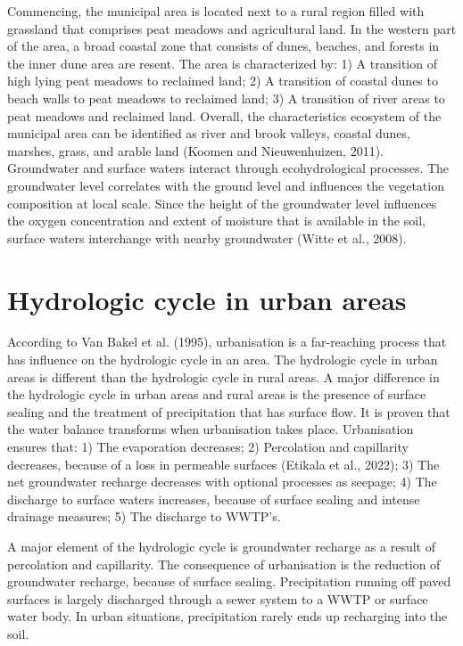 Commencing, the municipal area is located next to a rural region filled with grassland that comprises peat meadows and agricultural land. In the western part of the area, a broad coastal zone that consists of dunes, beaches, and forests in the inner dune area are resent. The area is characterized by: 1) A transition of high lying peat meadows to reclaimed land; 2) A transition of coastal dunes to beach walls to peat meadows to reclaimed land; 3) A transition of river areas to peat meadows and reclaimed land. Overall, the characteristics ecosystem of the municipal area can be identified as river and brook valleys, coastal dunes, marshes, grass, and arable land (Koomen and Nieuwenhuizen, 2011). Groundwater and surface waters interact through ecohydrological processes. The groundwater level correlates with the ground level and influences the vegetation composition at local scale. Since the height of the groundwater level influences the oxygen concentration and extent of moisture that is available in the soil, surface waters interchange with nearby groundwater (Witte et al., 2008). 

\section{Hydrologic cycle in urban areas}
According to Van Bakel et al. (1995), urbanisation is a far-reaching process that has influence on the hydrologic cycle in an area. The hydrologic cycle in urban areas is different than the hydrologic cycle in rural areas. A major difference in the hydrologic cycle in urban areas and rural areas is the presence of surface sealing and the treatment of precipitation that has surface flow. It is proven that the water balance transforms when urbanisation takes place. Urbanisation ensures that: 1) The evaporation decreases; 2) Percolation and capillarity decreases, because of a loss in permeable surfaces (Etikala et al., 2022); 3) The net groundwater recharge decreases with optional processes as seepage; 4) The discharge to surface waters increases, because of surface sealing and intense drainage measures; 5) The discharge to WWTP's. 

A major element of the hydrologic cycle is groundwater recharge as a result of percolation and capillarity. The consequence of urbanisation is the reduction of groundwater recharge, because of surface sealing. Precipitation running off paved surfaces is largely discharged through a sewer system to a WWTP or surface water body. In urban situations, precipitation rarely ends up recharging into the soil. 

